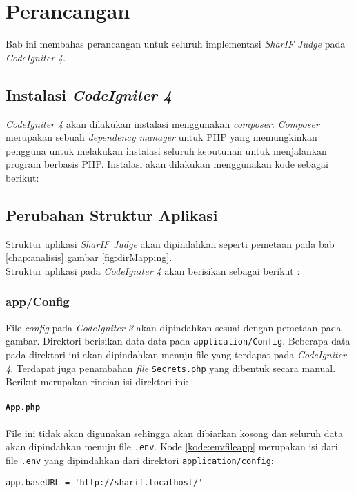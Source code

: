 \chapter{Perancangan}
\label{chap:perancangan}
Bab ini membahas perancangan untuk seluruh implementasi \textit{SharIF Judge} pada \textit{CodeIgniter 4}.

\section{Instalasi \textit{CodeIgniter 4}}
\textit{CodeIgniter 4} akan dilakukan instalasi menggunakan \textit{composer}. \textit{Composer} merupakan sebuah \textit{dependency manager} untuk PHP yang memungkinkan pengguna untuk melakukan instalasi seluruh kebutuhan untuk menjalankan program berbasis PHP. Instalasi akan dilakukan menggunakan kode sebagai berikut:

\section{Perubahan Struktur Aplikasi}
\label{sec:perubahanStruktur}
Struktur aplikasi \textit{SharIF Judge} akan dipindahkan seperti pemetaan pada bab \ref{chap:analisis} gambar \ref{fig:dirMapping}. 
\\
Struktur aplikasi pada \textit{CodeIgniter 4} akan berisikan sebagai berikut :
\subsection{app/Config}
File \textit{config} pada \textit{CodeIgniter 3} akan dipindahkan sesuai dengan pemetaan pada gambar. Direktori berisikan data-data pada \texttt{application/Config}. Beberapa data pada direktori ini akan dipindahkan menuju file yang terdapat pada \textit{CodeIgniter 4}. Terdapat juga penambahan \textit{file} \texttt{Secrets.php} yang dibentuk secara manual. Berikut merupakan rincian isi direktori ini:
\subsubsection{\texttt{App.php}}
File ini tidak akan digunakan sehingga akan dibiarkan kosong dan seluruh data akan dipindahkan menuju file \texttt{.env}. Kode \ref{kode:envfileapp} merupakan isi dari file \texttt{.env} yang dipindahkan dari direktori \texttt{application/config}:

\begin{lstlisting}[caption= Kode \texttt{application/config/App.php} yang dipindahkan menuju \texttt{.env}, label=kode:envfileapp]
	app.baseURL = 'http://sharif.localhost/'
\end{lstlisting}

